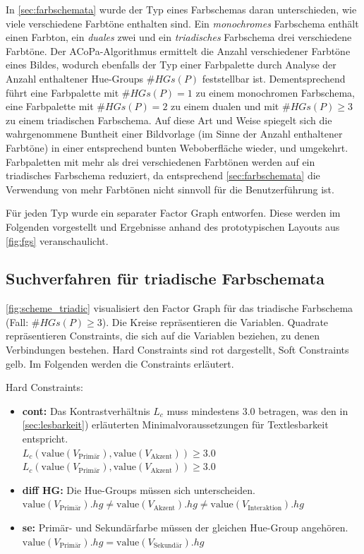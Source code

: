 In \autoref{sec:farbschemata} wurde der Typ eines Farbschemas daran unterschieden, wie viele verschiedene Farbtöne enthalten sind. Ein \emph{monochromes} Farbschema enthält einen Farbton, ein \emph{duales} zwei und ein \emph{triadisches} Farbschema drei verschiedene Farbtöne. Der ACoPa-Algorithmus ermittelt die Anzahl verschiedener Farbtöne eines Bildes, wodurch ebenfalls der Typ einer Farbpalette durch Analyse der Anzahl enthaltener Hue-Groups $\#HGs(P)$ feststellbar ist. Dementsprechend führt eine Farbpalette mit $\#HGs(P) = 1$ zu einem monochromen Farbschema, eine Farbpalette mit $\#HGs(P) = 2$ zu einem dualen und mit $\#HGs(P) \geq 3$ zu einem triadischen Farbschema. Auf diese Art und Weise spiegelt sich die wahrgenommene \glqq{}Buntheit\grqq{} einer Bildvorlage (im Sinne der Anzahl enthaltener Farbtöne) in einer entsprechend bunten Weboberfläche wieder, und umgekehrt. Farbpaletten mit mehr als drei verschiedenen Farbtönen werden auf ein triadisches Farbschema reduziert, da entsprechend \autoref{sec:farbschemata} die Verwendung von mehr Farbtönen nicht sinnvoll für die Benutzerführung ist.

Für jeden Typ wurde ein separater Factor Graph entworfen. Diese werden im Folgenden vorgestellt und Ergebnisse anhand des prototypischen Layouts aus \autoref{fig:fgs} veranschaulicht.

\subsection{Suchverfahren für triadische Farbschemata}

\autoref{fig:scheme_triadic} visualisiert den Factor Graph für das triadische Farbschema (Fall: $\#HGs(P) \geq 3$). Die Kreise repräsentieren die Variablen. Quadrate repräsentieren Constraints, die sich auf die Variablen beziehen, zu denen Verbindungen bestehen. Hard Constraints sind rot dargestellt, Soft Constraints gelb. Im Folgenden werden die Constraints erläutert.

Hard Constraints:
\begin{itemize}
	\item \textbf{cont:} Das Kontrastverhältnis $L_c$ muss mindestens 3.0 betragen, was den in \autoref{sec:lesbarkeit}) erläuterten Minimalvoraussetzungen für Textlesbarkeit  entspricht.\\
		$L_c(\text{value}(V_\text{Primär}), \text{value}(V_\text{Akzent})) \geq 3.0$\\
		$L_c(\text{value}(V_\text{Primär}), \text{value}(V_\text{Akzent})) \geq 3.0$
	\item \textbf{diff HG:} Die Hue-Groups müssen sich unterscheiden. \\ $\text{value}(V_\text{Primär}).hg \neq \text{value}(V_\text{Akzent}).hg \neq \text{value}(V_\text{Interaktion}).hg$
	\item \textbf{se:} Primär- und Sekundärfarbe müssen der gleichen Hue-Group angehören.\\
		$\text{value}(V_\text{Primär}).hg = \text{value}(V_\text{Sekundär}).hg$
\end{itemize}


